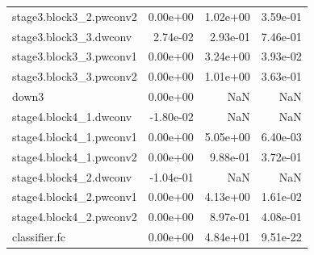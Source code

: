 \begin{longtable}{lrrr}
stage3.block3_2.pwconv2 & 0.00e+00 & 1.02e+00 & 3.59e-01 \\
stage3.block3_3.dwconv & 2.74e-02 & 2.93e-01 & 7.46e-01 \\
stage3.block3_3.pwconv1 & 0.00e+00 & 3.24e+00 & 3.93e-02 \\
stage3.block3_3.pwconv2 & 0.00e+00 & 1.01e+00 & 3.63e-01 \\
down3 & 0.00e+00 & NaN & NaN \\
stage4.block4_1.dwconv & -1.80e-02 & NaN & NaN \\
stage4.block4_1.pwconv1 & 0.00e+00 & 5.05e+00 & 6.40e-03 \\
stage4.block4_1.pwconv2 & 0.00e+00 & 9.88e-01 & 3.72e-01 \\
stage4.block4_2.dwconv & -1.04e-01 & NaN & NaN \\
stage4.block4_2.pwconv1 & 0.00e+00 & 4.13e+00 & 1.61e-02 \\
stage4.block4_2.pwconv2 & 0.00e+00 & 8.97e-01 & 4.08e-01 \\
classifier.fc & 0.00e+00 & 4.84e+01 & 9.51e-22 \\
\end{longtable}
